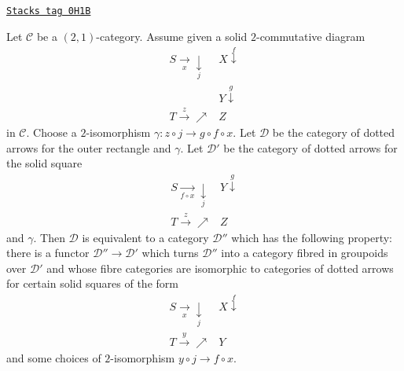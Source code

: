 \begin{lemma}
\label{categories-lemma-cat-dotted-arrows-composition}
\href{https://stacks.math.columbia.edu/tag/0H1B}{\texttt{Stacks tag 0H1B}}

Let $\mathcal{C}$ be a $(2,1)$-category. Assume given a solid $2$-commutative
diagram
$$
\begin{array}{cc}S \underset{x}{\longrightarrow}\underset{j}{\downarrow} & X \overset{f}{\downarrow} \\  & Y \overset{g}{\downarrow} \\ T \overset{z}{\longrightarrow}\nearrow & Z\end{array}
$$
in $\mathcal{C}$.
Choose a $2$-isomorphism $\gamma \colon z \circ j \to g \circ f \circ x$.
Let $\mathcal{D}$ be the category of dotted arrows for
the outer rectangle and $\gamma$. Let $\mathcal{D}'$ be
the category of dotted arrows for the solid square
$$
\begin{array}{cc}S \underset{f \circ x}{\longrightarrow}\underset{j}{\downarrow} & Y \overset{g}{\downarrow} \\ T \overset{z}{\longrightarrow}\nearrow & Z\end{array}
$$
and $\gamma$. Then $\mathcal{D}$ is equivalent to
a category $\mathcal{D}''$ which has the following property:
there is a functor $\mathcal{D}'' \to \mathcal{D}'$ which turns $\mathcal{D}''$
into a category fibred in groupoids over $\mathcal{D}'$ and whose fibre
categories are isomorphic to categories of dotted arrows for certain
solid squares of the form
$$
\begin{array}{cc}S \underset{x}{\longrightarrow}\underset{j}{\downarrow} & X \overset{f}{\downarrow} \\ T \overset{y}{\longrightarrow}\nearrow & Y\end{array}
$$
and some choices of $2$-isomorphism $y \circ j \to f \circ x$.
\end{lemma}

